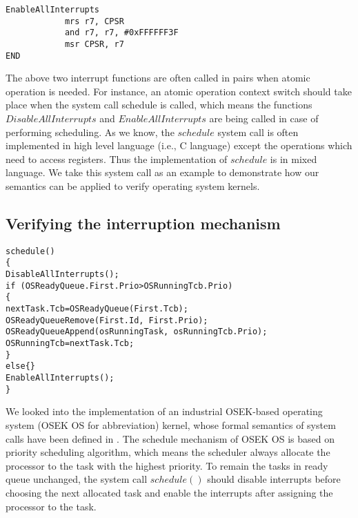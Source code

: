 \documentclass[letterpaper, 10 pt, conference]{IEEEtran}
\begin{document}
\begin{lstlisting}[xleftmargin=1em]
EnableAllInterrupts																		
			mrs r7, CPSR								
			and r7, r7, #0xFFFFFF3F			
			msr CPSR, r7							
END									
\end{lstlisting}
\vspace{11pt}
\par The above two interrupt functions are often called in pairs when atomic operation is needed. For instance, an atomic operation context switch should take place when the system call schedule is called, which means the functions $DisableAllInterrupts$ and $EnableAllInterrupts$ are being called in case of performing scheduling. As we know, the $schedule$ system call is often implemented in high level language (i.e., C language) except the operations which need to access registers. Thus the implementation of $schedule$ is in mixed language. We take this system call as an example to demonstrate how our semantics can be applied to verify operating system kernels.
\subsection{Verifying the interruption mechanism}
\vspace{11pt}
\begin{lstlisting}[xleftmargin=1em]
schedule()
{
DisableAllInterrupts();
if (OSReadyQueue.First.Prio>OSRunningTcb.Prio)
{
nextTask.Tcb=OSReadyQueue(First.Tcb);
OSReadyQueueRemove(First.Id, First.Prio);
OSReadyQueueAppend(osRunningTask, osRunningTcb.Prio);
OSRunningTcb=nextTask.Tcb;
}
else{}
EnableAllInterrupts();
}
\end{lstlisting}
\vspace{11pt}	
\par We looked into the implementation of an industrial OSEK-based operating system (OSEK OS for abbreviation) \cite{osek} kernel, whose formal semantics of system calls have been defined in \cite{xiaoran}. The schedule mechanism of OSEK OS is based on priority scheduling algorithm, which means the scheduler always allocate the processor to the task with the highest priority. To remain the tasks in ready queue unchanged, the system call $schedule()$ should disable interrupts before choosing the next allocated task and enable the interrupts after assigning the processor to the task.
\end{document}
